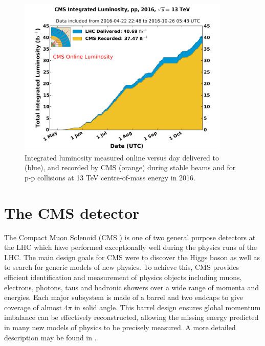 \begin{figure}
\centering
    \includegraphics[width=0.9\textwidth]{./Figures/detector/int_lumi_per_day_cumulative_pp_2016OnlineLumi}
  \caption{Integrated luminosity measured online versus day delivered to (blue), 
  and recorded by CMS (orange) during stable beams and for p-p collisions at 13 TeV centre-of-mass energy in 2016.}
  \label{fig:LHC-integrated-lumi}
\end{figure}

\section{The CMS detector}
The Compact Muon Solenoid (CMS \cite{CMS}) is one of two general purpose detectors at the LHC 
which have performed exceptionally well during the physics runs of the LHC. The main design goals
for CMS were to discover the Higgs boson as well as to search for generic models 
of new physics. To achieve this, CMS provides efficient identification and measurement
of physics objects including muons, electrons, photons, taus and hadronic showers over a
wide range of momenta and energies. Each major subsystem is made of a barrel
and two endcaps to give coverage of almost $4\pi$ in solid angle. 
This barrel design ensures global momentum imbalance can be effectively 
reconstructed, allowing the missing energy predicted in many new models of physics to be
precisely measured. A more detailed description may be found in \cite{CMS}.  

